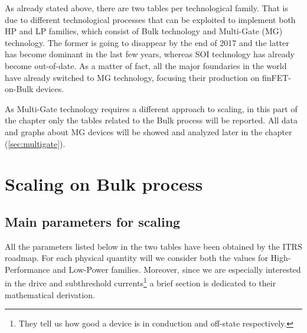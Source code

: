 \documentclass[a4paper, 12pt, twoside, openright]{report}
\begin{document}

As already stated above, there are two tables per technological family. That is due to different technological processes that can be exploited to implement both HP and LP families, which consist of Bulk technology and Multi-Gate (MG) technology. The former is going to disappear by the end of 2017 and the latter has become dominant in the last few years, whereas SOI technology has already become out-of-date. As a matter of fact, all the major foundaries in the world have already switched to MG technology, focusing their production on finFET-on-Bulk devices.

\noindent As Multi-Gate technology requires a different approach to scaling, in this part of the chapter only the tables related to the Bulk process will be reported. All data and graphs about MG devices will be showed and analyzed later in the chapter (\ref{sec:multigate}).

\chapter{Scaling on Bulk process}

\section{Main parameters for scaling}
All the parameters listed below in the two tables have been obtained by the ITRS roadmap. For each physical quantity will we consider both the values for High-Performance and Low-Power families. Moreover, since we are especially interested in the drive and subthreshold currents\footnote{They tell us how good a device is in conduction and off-state respectively.} a brief section is dedicated to their mathematical derivation.
\end{document}
